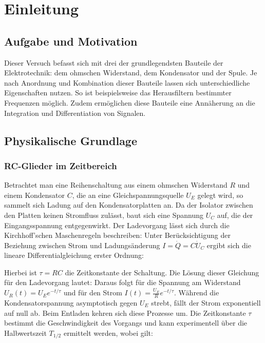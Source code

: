 \chapter{Einleitung} \label{ch:Einleitung}

\section{Aufgabe und Motivation}
\label{sec:AuM}
Dieser Versuch befasst sich mit drei der grundlegendsten Bauteile der Elektrotechnik: dem ohmschen Widerstand, dem Kondensator und der Spule. Je nach Anordnung und Kombination dieser Bauteile lassen sich unterschiedliche Eigenschaften nutzen. So ist beispielsweise das Herausfiltern bestimmter Frequenzen möglich. Zudem ermöglichen diese Bauteile eine Annäherung an die Integration und Differentiation von Signalen.

\section{Physikalische Grundlage}
\label{sec:PhyBasics}

\subsection{RC-Glieder im Zeitbereich}
Betrachtet man eine Reihenschaltung aus einem ohmschen Widerstand $R$ und einem Kondensator $C$, die an eine Gleichspannungsquelle $U_E$ gelegt wird, so sammelt sich Ladung auf den Kondensatorplatten an. Da der Isolator zwischen den Platten keinen Stromfluss zulässt, baut sich eine Spannung $U_C$ auf, die der Eingangsspannung entgegenwirkt. Der Ladevorgang lässt sich durch die Kirchhoff'schen Maschenregeln beschreiben:
Unter Berücksichtigung der Beziehung zwischen Strom und Ladungsänderung $I = \dot{Q} = C \dot{U}_C$ ergibt sich die lineare Differentialgleichung erster Ordnung:


Hierbei ist $\tau = RC$ die Zeitkonstante der Schaltung. Die Lösung dieser Gleichung für den Ladevorgang lautet:
Daraus folgt für die Spannung am Widerstand $U_R(t) = U_E e^{-t/\tau}$ und für den Strom $I(t) = \frac{U_E}{R} e^{-t/\tau}$. Während die Kondensatorspannung asymptotisch gegen $U_E$ strebt, fällt der Strom exponentiell auf null ab. Beim Entladen kehren sich diese Prozesse um. Die Zeitkonstante $\tau$ bestimmt die Geschwindigkeit des Vorgangs und kann experimentell über die Halbwertszeit $T_{1/2}$ ermittelt werden, wobei gilt:

